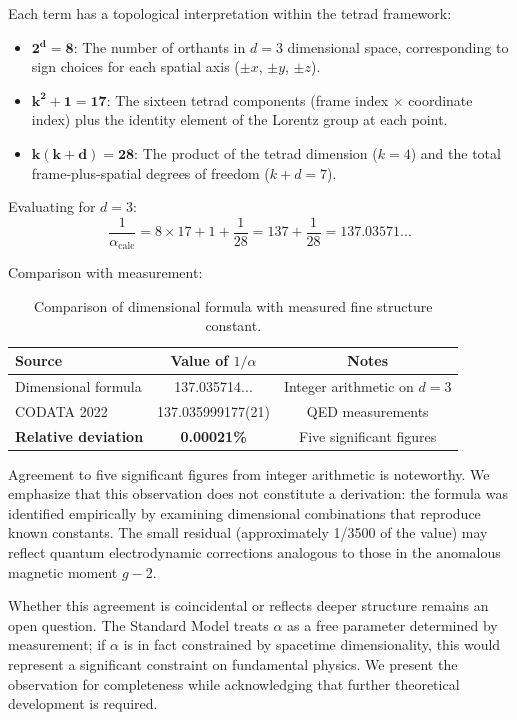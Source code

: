 \documentclass[aps,prd,preprint,superscriptaddress,showpacs,preprintnumbers,amsmath,amssymb,nofootinbib]{revtex4-2}
\begin{document}
Each term has a topological interpretation within the tetrad framework:
\begin{itemize}
\item $\mathbf{2^d = 8}$: The number of orthants in $d = 3$ dimensional space, corresponding to sign choices for each spatial axis ($\pm x$, $\pm y$, $\pm z$).
\item $\mathbf{k^2 + 1 = 17}$: The sixteen tetrad components (frame index $\times$ coordinate index) plus the identity element of the Lorentz group at each point.
\item $\mathbf{k(k + d) = 28}$: The product of the tetrad dimension ($k = 4$) and the total frame-plus-spatial degrees of freedom ($k + d = 7$).
\end{itemize}

Evaluating for $d = 3$:
\begin{equation}
\frac{1}{\alpha_{\text{calc}}} = 8 \times 17 + 1 + \frac{1}{28} = 137 + \frac{1}{28} = 137.03571...
\end{equation}

Comparison with measurement:

\begin{table}[H]
\centering
\begin{tabular*}{\textwidth}{@{\extracolsep{\fill}} lcc @{}}
\toprule
\textbf{Source} & \textbf{Value of $1/\alpha$} & \textbf{Notes} \\
\midrule
Dimensional formula & 137.035714... & Integer arithmetic on $d = 3$ \\
CODATA 2022 & 137.035999177(21) & QED measurements \\
\textbf{Relative deviation} & \textbf{0.00021\%} & Five significant figures \\
\bottomrule
\end{tabular*}
\caption{Comparison of dimensional formula with measured fine structure constant.}
\label{tab:alpha-comparison}
\end{table}

Agreement to five significant figures from integer arithmetic is noteworthy. We emphasize that this observation does not constitute a derivation: the formula was identified empirically by examining dimensional combinations that reproduce known constants. The small residual (approximately 1/3500 of the value) may reflect quantum electrodynamic corrections analogous to those in the anomalous magnetic moment $g - 2$.

Whether this agreement is coincidental or reflects deeper structure remains an open question. The Standard Model treats $\alpha$ as a free parameter determined by measurement; if $\alpha$ is in fact constrained by spacetime dimensionality, this would represent a significant constraint on fundamental physics. We present the observation for completeness while acknowledging that further theoretical development is required.
\end{document}
